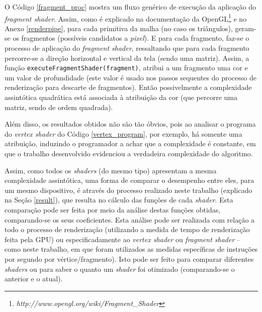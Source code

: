 	 

	O Código \ref{fragment_proc} mostra um fluxo genérico de execução da aplicação do \textit{fragment shader}. Assim, como é explicado na documentação da OpenGL\footnote{\textit{http://www.opengl.org/wiki/Fragment\_Shader}} e no Anexo \ref{renderpipe}, para cada primitiva da malha (no caso os triângulos), geram-se os fragmentos (possíveis candidatos a \textit{pixel}). E para cada fragmento, faz-se o processo de aplicação do \textit{fragment shader}, ressaltando que para cada fragmento percorre-se a direção horizontal e vertical da tela (sendo uma matriz). Assim, a função \texttt{executeFragmentShader(fragment)}, atribui a um fragmento uma cor e um valor de profundidade (este valor é usado nos passos sequentes do processo de renderização para descarte de fragmentos). Então possivelmente a complexidade assintótica quadrática está associada à atribuição da cor (que percorre uma matriz, sendo de ordem quadrada). 

	 

	Além disso, os resultados obtidos não são tão óbvios, pois ao analisar o programa do \textit{vertex shader} do Código \ref{vertex_program}, por exemplo, há somente uma atribuição, induzindo o programador  a achar que a complexidade é constante, em que o trabalho desenvolvido evidenciou a verdadeira complexidade do algoritmo.

	 
	
	Assim, como todos os \textit{shaders} (do mesmo tipo) apresentam a mesma complexidade assintótica, uma forma de comparar o desempenho entre eles, para um mesmo dispositivo, é através do processo realizado neste trabalho (explicado na Seção \ref{result}), que resulta no cálculo das funções de cada \textit{shader}. Esta comparação pode ser feita por meio da análise destas funções obtidas, comparando-se os seus coeficientes. Esta análise pode ser realizada com relação a todo o processo de renderização (utilizando a medida de tempo de renderização feita pela GPU) ou especificadamente ao \textit{vertex shader} ou \textit{fragment shader} -- como neste trabalho, em que foram utilizados as medidas específicas de instruções por segundo por vértice/fragmento).  Isto pode ser feito para comparar diferentes \textit{shaders} ou para saber o quanto um \textit{shader} foi otimizado (comparando-se o anterior e o atual). 

